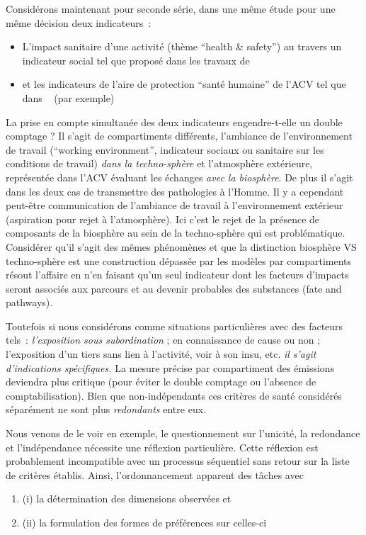 {Considérons maintenant pour seconde série, dans une même étude pour une même décision deux indicateurs~:
\begin{itemize}
\item L'impact sanitaire d'une activité (thème ``health \& safety'') au travers un indicateur social tel que proposé dans les travaux de \citeauthor{benoit-norris_identifying_2012}~\cite{benoit-norris_identifying_2012}
\item et les indicateurs de l'aire de protection ``santé humaine'' de l'\gls{ACV} tel que dans ~\cite{jolliet_impact_2003} (par exemple)
\end{itemize}
La prise en compte simultanée des deux indicateurs engendre-t-elle un double comptage ?
Il s'agit de compartiments différents, l'ambiance de l'environnement de travail (``working environment'', indicateur sociaux ou sanitaire sur les conditions de travail) \emph{dans la techno-sphère} et l'atmosphère extérieure, représentée dans l'\gls{ACV} évaluant les échanges \emph{avec la biosphère}.
De plus il s'agit dans les deux cas de transmettre des pathologies à l'Homme.
Il y a cependant peut-être communication de l'ambiance de travail à l'environnement extérieur (aspiration pour rejet à l'atmosphère).
Ici c'est le rejet de la présence de composants de la biosphère au sein de la techno-sphère qui est problématique.
Considérer qu'il s'agit des mêmes phénomènes et que la distinction biosphère VS techno-sphère est une construction dépassée par les modèles par compartiments résout l'affaire en n'en faisant qu'un seul indicateur dont les facteurs d'impacts seront associés aux parcours et au devenir probables des substances (fate and pathways).

Toutefois si nous considérons comme situations particulières avec des facteurs tels~: \emph{l'exposition sous subordination} ; en connaissance de cause ou non ; l'exposition d'un tiers sans lien à l'activité, voir à son insu, etc. \emph{il s'agit d'indications spécifiques.}
La mesure précise par compartiment des émissions deviendra plus critique (pour éviter le double comptage ou l'absence de comptabilisation).
Bien que non-indépendants ces critères de santé considérés séparément ne sont plus \emph{redondants} entre eux.
}

Nous venons de le voir en exemple, le questionnement sur l'unicité, la redondance et l'indépendance nécessite une réflexion particulière.
Cette réflexion est probablement incompatible avec un processus séquentiel sans retour sur la liste de critères établis.
Ainsi, l'ordonnancement apparent des tâches avec\begin{enumerate}
\item (i) la détermination des dimensions observées et
\item (ii) la formulation des formes de préférences sur celles-ci
\end{enumerate}

